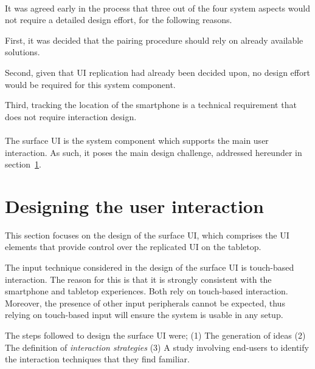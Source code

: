 \hfill\\
It was agreed early in the process that three out of the four system aspects would not require a detailed design effort, for the following reasons.

First, it was decided that the pairing procedure should rely on already available solutions.

Second, given that UI replication had already been decided upon, no design effort would be required for this system component.

Third, tracking the location of the smartphone is a technical requirement that does not require interaction design. %
\hfill\\
\hfill\\
The surface UI is the system component which supports the main user interaction.
As such, it poses the main design challenge, addressed hereunder in section~\ref{sec:interaction}.

\section{Designing the user interaction}
\label{sec:interaction}

This section focuses on the design of the surface UI, which comprises the UI elements that provide control over the replicated UI on the tabletop.

The input technique considered in the design of the surface UI is touch-based interaction.
The reason for this is that it is strongly consistent with the smartphone and tabletop experiences.
Both rely on touch-based interaction.
Moreover, the presence of other input peripherals cannot be expected, thus relying on touch-based input will ensure the system is usable in any setup.

The steps followed to design the surface UI were; (1) The generation of ideas (2) The definition of \emph{interaction strategies} (3) A study involving end-users to identify the interaction techniques that they find familiar.


